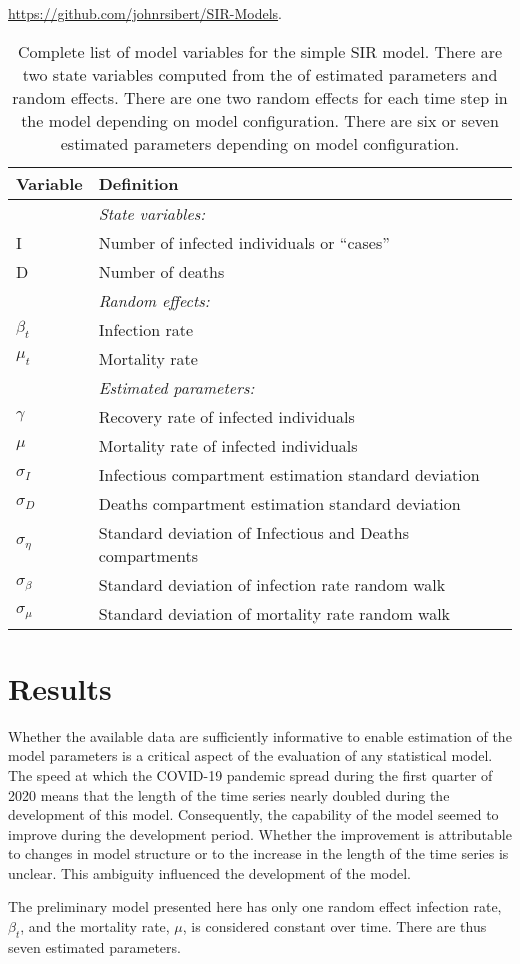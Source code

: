 \documentclass[12pt,letterpaper]{article}
\begin{document}
\url{https://github.com/johnrsibert/SIR-Models}.



\begin{table}
\caption{Complete list of model variables for the simple SIR model.
There are two state variables computed from the of estimated
parameters and random effects.
There are one two random effects for each time step in the model
depending on model configuration.
There are six or seven estimated parameters depending on model
configuration. 
}
\label{tab:allvars1}
\begin{center}
\begin{tabular}{ll}
\hline
Variable & Definition\\
\hline
\hline
       & {\it State variables:}\\
I      & Number of infected individuals or ``cases''\\
D      & Number of deaths\\
       & {\it Random effects:}\\
$\beta_t$ & Infection rate\\
$\mu_t$   & Mortality rate\\
       & {\it Estimated parameters:}\\
$\gamma$   & Recovery rate of infected individuals\\
$\mu$      & Mortality rate of infected individuals\\
$\sigma_I$ & Infectious compartment estimation standard deviation\\
$\sigma_D$ & Deaths compartment estimation standard deviation\\
$\sigma_\eta$ & Standard deviation of Infectious and Deaths compartments\\
$\sigma_\beta$ & Standard deviation of infection rate random walk\\
$\sigma_\mu$ & Standard deviation of mortality rate random walk\\
\hline
\end{tabular}
\end{center}
\end{table}

\section*{Results}

Whether the available data are sufficiently informative to enable
estimation of the model parameters is a critical aspect of the
evaluation of any statistical model.
The speed at which the COVID-19 pandemic spread during the first
quarter of
2020 means that the length of the time series nearly doubled during
the development of this model. Consequently, the capability of the
model seemed to improve during the development period.
Whether the improvement is
attributable to changes in model structure or to the increase in the
length of the time series is unclear. This ambiguity influenced the
development of the model.

The preliminary model presented here has only one random effect
infection rate, $\beta_t$, and the mortality rate, $\mu$, is
considered constant over time. There are thus seven estimated
parameters.      

\clearpage
\printbibliography[title=References]
\end{document}
